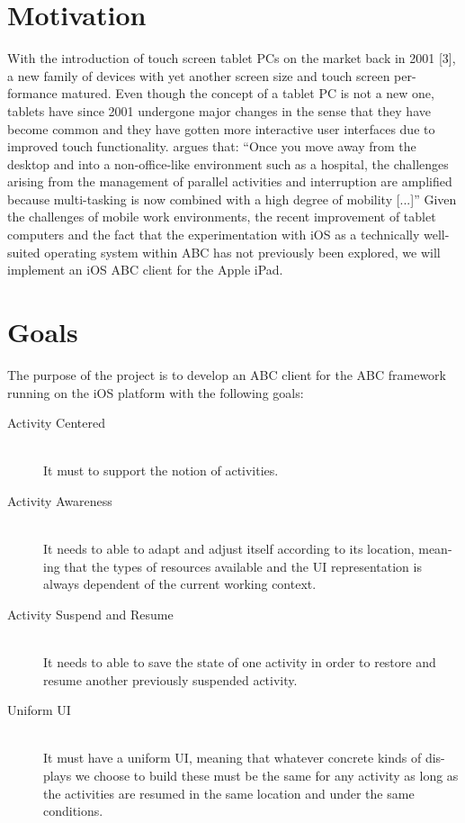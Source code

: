 \section{Motivation}
With the introduction of touch screen tablet PCs on the market back in 2001 [3], a new family of devices with yet another screen size and touch screen per- formance matured. Even though the concept of a tablet PC is not a new one, tablets have since 2001 undergone major changes in the sense that they have become common and they have gotten more interactive user interfaces due to improved touch functionality. \citet{bardram2011} argues that: “Once you move away from the desktop and into a non-office-like environment such as a hospital, the challenges arising from the management of parallel activities and interruption are amplified because multi-tasking is now combined with a high degree of mobility [...]”
Given the challenges of mobile work environments, the recent improvement of tablet computers and the fact that the experimentation with iOS as a technically well-suited operating system within ABC has not previously been explored, we will implement an iOS ABC client for the Apple iPad.

\section{Goals}
The purpose of the project is to develop an ABC client for the ABC framework running on the iOS platform with the following goals:

\begin{description}
  \item[Activity Centered] \hfill \\
  It must to support the notion of activities.
  \item[Activity Awareness] \hfill \\
  It needs to able to adapt and adjust itself according to its location, mean- ing that the types of resources available and the UI representation is always dependent of the current working context.
  \item[Activity Suspend and Resume] \hfill \\
  It needs to able to save the state of one activity in order to restore and resume another previously suspended activity.
  \item[Uniform UI] \hfill \\
  It must have a uniform UI, meaning that whatever concrete kinds of dis- plays we choose to build these must be the same for any activity as long as the activities are resumed in the same location and under the same conditions.
\end{description}

